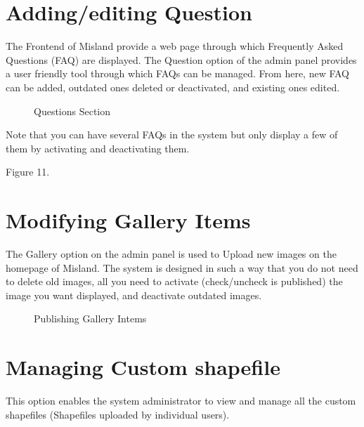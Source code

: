 \documentclass[letterpaper,10pt,english]{sphinxmanual}
\let\sphinxpxdimen\pdfpxdimen\else\newdimen\sphinxpxdimen
\begin{document}
\section{Adding/editing Question}
\label{\detokenize{Introduction/admin:adding-editing-question}}
\sphinxAtStartPar
The Frontend of Misland provide a web page through which Frequently Asked Questions (FAQ) are displayed.  The Question option of the admin panel provides a user friendly  tool  through which FAQs can be managed. From here, new FAQ can be added, outdated ones deleted or deactivated, and existing ones edited.

\begin{figure}[H]
\centering
\capstart

\noindent\sphinxincludegraphics[width=663\sphinxpxdimen,height=287\sphinxpxdimen]{{admin4}.png}
\caption{Questions Section}\label{\detokenize{Introduction/admin:id10}}\end{figure}

\sphinxAtStartPar
Note that you can have several FAQs in the system but only display a few of them by activating and deactivating them.

\sphinxAtStartPar
Figure 11.


\section{Modifying Gallery Items}
\label{\detokenize{Introduction/admin:modifying-gallery-items}}
\sphinxAtStartPar
The Gallery option on the admin panel is used to Upload new images on the homepage of Misland. The system is designed in such a way that you do not need to delete old images, all you need to activate (check/uncheck is published) the image you want displayed, and deactivate outdated images.

\begin{figure}[H]
\centering
\capstart

\noindent\sphinxincludegraphics[width=741\sphinxpxdimen,height=586\sphinxpxdimen]{{admin12}.png}
\caption{Publishing Gallery Intems}\label{\detokenize{Introduction/admin:id11}}\end{figure}


\section{Managing Custom shapefile}
\label{\detokenize{Introduction/admin:managing-custom-shapefile}}
\sphinxAtStartPar
This option enables the system administrator to view and manage all the custom shapefiles (Shapefiles uploaded by individual users).
\end{document}
